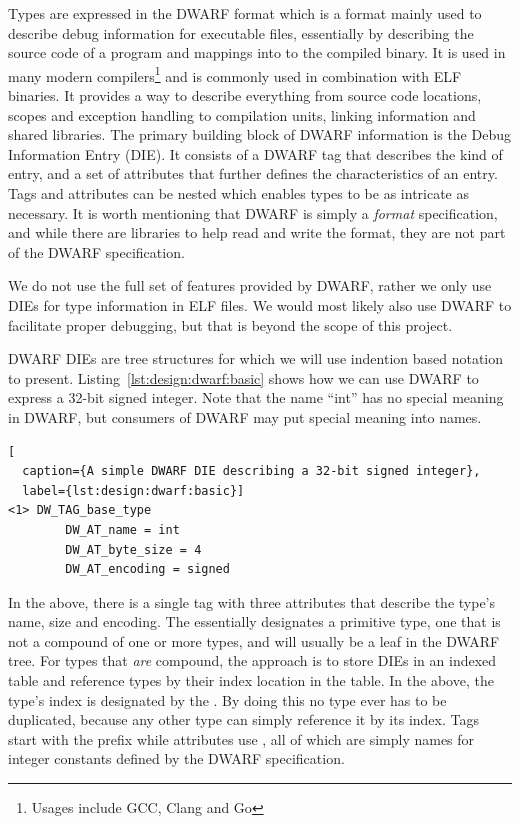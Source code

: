 Types are expressed in the DWARF format\cite{dwarf} which is a format mainly
used to describe debug information for executable files, essentially by
describing the source code of a program and mappings into to the compiled
binary. It is used in many modern compilers\footnote{Usages include GCC, Clang
  and Go} and is commonly used in combination with ELF binaries. It provides a
way to describe everything from source code locations, scopes and exception
handling to compilation units, linking information and shared libraries. The
primary building block of DWARF information is the Debug Information Entry
(DIE). It consists of a DWARF tag that describes the kind of entry, and a set of
attributes that further defines the characteristics of an entry. Tags and
attributes can be nested which enables types to be as intricate as necessary. It
is worth mentioning that DWARF is simply a \emph{format} specification, and
while there are libraries to help read and write the format, they are not part
of the DWARF specification.

We do not use the full set of features provided by DWARF, rather we only use
DIEs for type information in ELF files. We would most likely also use DWARF to
facilitate proper debugging, but that is beyond the scope of this project.

DWARF DIEs are tree structures for which we will use indention based notation to
present. Listing~\ref{lst:design:dwarf:basic} shows how we can use DWARF to
express a 32-bit signed integer. Note that the name ``int'' has no special
meaning in DWARF, but consumers of DWARF may put special meaning into names.

\begin{lstlisting}[
  caption={A simple DWARF DIE describing a 32-bit signed integer},
  label={lst:design:dwarf:basic}]
<1> DW_TAG_base_type
        DW_AT_name = int
        DW_AT_byte_size = 4
        DW_AT_encoding = signed
\end{lstlisting}

In the above, there is a single tag with three attributes that describe the
type's name, size and encoding. The  essentially
designates a primitive type, one that is not a compound of one or more types,
and will usually be a leaf in the DWARF tree. For types that \emph{are}
compound, the approach is to store DIEs in an indexed table and reference types
by their index location in the table. In the above, the type's index is
designated by the . By doing this no type ever has to be duplicated,
because any other type can simply reference it by its index. Tags start with the
 prefix while attributes use , all of which are
simply names for integer constants defined by the DWARF specification.


